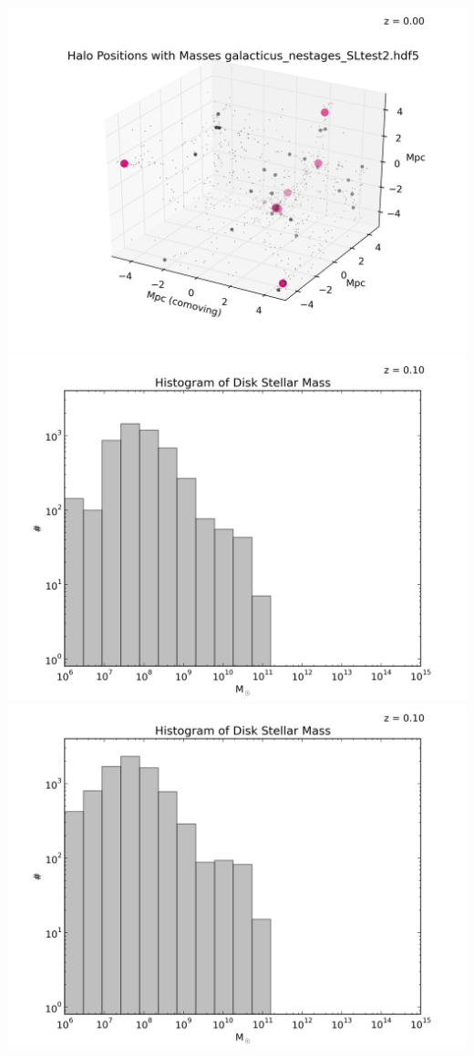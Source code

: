 \documentclass[a4paper,11pt,fleqn,oneside]{book}
\begin{document}
\begin{itemize}
\includegraphics[scale=0.75]{analysis/galacticus/positionPlotsMasses/Halo_Positions_with_Masses_galacticus_nestages_SLtest2_5Mpc_0003.png} \\
\includegraphics[scale=0.5]{analysis/galacticus/histograms/Histogram_of_Disk_Stellar_Massgalacticus_nestages12_0000.png} \\
\includegraphics[scale=0.5]{analysis/galacticus/histograms/Histogram_of_Disk_Stellar_Massgalacticus_nestages12SLtest_0000.png} \\

\end{itemize}
\end{document}
